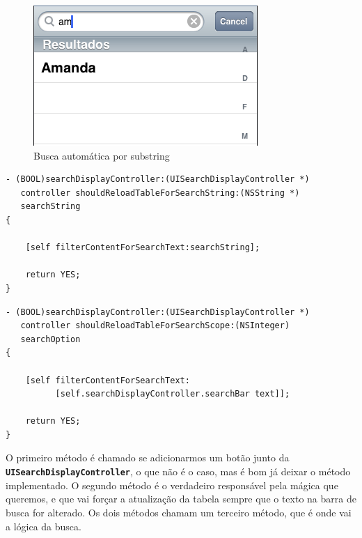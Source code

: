 \documentclass[a4paper,12pt,brazil,doubleside]{book}
\begin{document}
\begin{figure}[h]
  \centering
  \includegraphics[totalheight=0.2\textheight]{figuras/table/table7.png}
  \caption{Busca automática por substring}
  \label{fig:a}
\end{figure}

\begin{listing}
\begin{verbatim}
- (BOOL)searchDisplayController:(UISearchDisplayController *)
   controller shouldReloadTableForSearchString:(NSString *)
   searchString
{
    
    [self filterContentForSearchText:searchString];

    return YES;
}
\end{verbatim}
\end{listing}

\begin{listing}
\begin{verbatim}
- (BOOL)searchDisplayController:(UISearchDisplayController *)
   controller shouldReloadTableForSearchScope:(NSInteger)
   searchOption
{
    
    [self filterContentForSearchText:
          [self.searchDisplayController.searchBar text]];
    
    return YES;
}
\end{verbatim}
\end{listing}

\pagebreak

O primeiro método é chamado se adicionarmos um botão junto da\\
\texttt{\textbf{UISearchDisplayController}}, o que não é o caso, mas é bom já deixar o método implementado. O segundo método é o verdadeiro responsável pela mágica que queremos, e que vai forçar a atualização da tabela sempre que o texto na barra de busca for alterado. Os dois métodos chamam um terceiro método, que é onde vai a lógica da busca.
\end{document}
